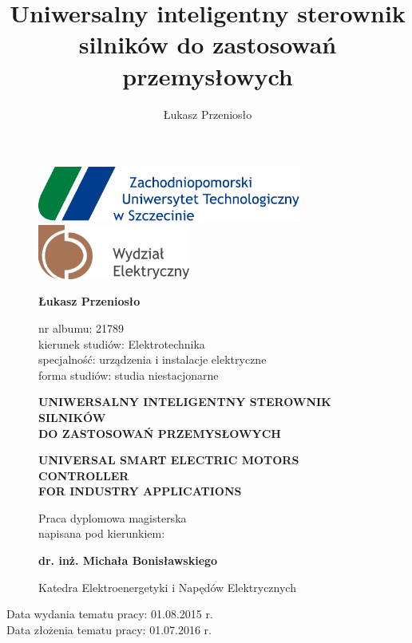 \documentclass[12pt]{mwart}
\title{Uniwersalny inteligentny sterownik silników do zastosowań przemysłowych}
\author{Łukasz Przeniosło}
\numberwithin{equation}{section}
\newcommand{\paperTitlePl}{UNIWERSALNY INTELIGENTNY STEROWNIK SILNIKÓW \\ DO ZASTOSOWAŃ PRZEMYSŁOWYCH}
\newcommand{\paperTitleEn}{UNIVERSAL SMART ELECTRIC MOTORS CONTROLLER \\ FOR INDUSTRY APPLICATIONS}
\newcommand{\topicChooseDate}{01.08.2015 r.}
\newcommand{\topicAcceptationDate}{01.07.2016 r.}
\begin{document}
\thispagestyle{empty} %

\begin{figure}[h]
	\centering
	\includegraphics[height=18mm]{grafiki/logo_zut.pdf}
	\hspace{5mm}
	\includegraphics[height=18mm]{grafiki/logo_zut_we.pdf} \\
	\vspace{20mm}


	{\bf \large Łukasz Przeniosło} \\ 
	\vspace{5mm}

	nr albumu: 21789 \\
	kierunek studiów: Elektrotechnika \\
	specjalność: urządzenia i instalacje elektryczne \\
	forma studiów: studia niestacjonarne \\
	\vspace{20mm}

	\textsc{\textbf{\large \paperTitlePl{}}} \\
	\vspace{5mm}

	\textsc{\textbf{\large \paperTitleEn{}}} \\
	\vspace{45mm}
	
	Praca dyplomowa magisterska \\
	napisana pod kierunkiem: \\
	\vspace{2mm}
	
	{\bf \large dr. inż. Michała Bonisławskiego} \\
	\vspace{2mm}
	
	Katedra Elektroenergetyki i Napędów Elektrycznych
	\vspace{5mm}
	
\end{figure}

\begin{flushleft}
	{\footnotesize Data wydania tematu pracy: \topicChooseDate} \\
	{\footnotesize Data złożenia tematu pracy: \topicAcceptationDate} 
\end{flushleft}
\end{document}
